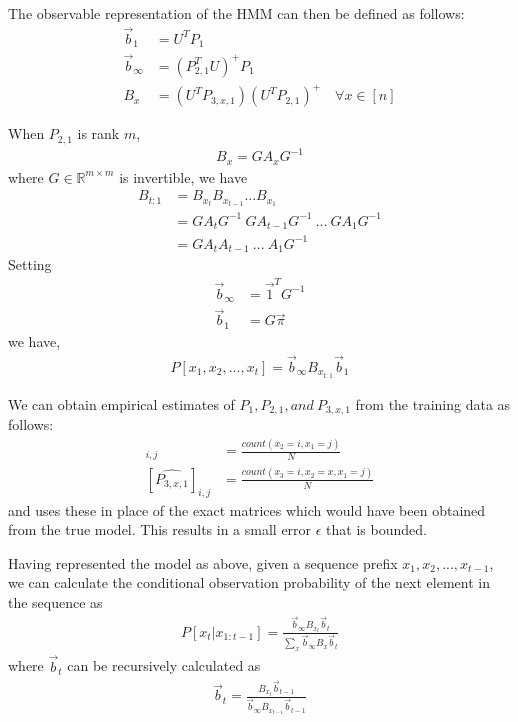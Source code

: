 \documentclass[letterpaper]{article}
\begin{document}
The observable representation of the HMM can then be defined as follows:
\begin{align*}
	\vec b_{1}      & = U^{T}P_{1}                                                 \\
	\vec b_{\infty} & = (P_{2,1}^{T}U)^{+}P_{1}                                    \\
	B_{x}           & = (U^{T}P_{3,x,1})(U^{T}P_{2,1})^{+} \quad \forall x \in [n] 
\end{align*}

When $P_{2,1}$ is rank $m$, 
\begin{align*}
	B_{x} = GA_{x}G^{-1} 
\end{align*}
where $G \in \mathbb{R}^{m \times m}$ is invertible, we have
\begin{align*}
	B_{t:1} & = B_{x_{t}}B_{x_{t-1}}...B_{x_{1}}                \\
	        & = GA_{t}G^{-1}\ GA_{t-1}G^{-1}\ ...\ GA_{1}G^{-1} \\
	        & = GA_{t}A_{t-1}\ ...\ A_{1}G^{-1}                 
\end{align*}
Setting 
\begin{align*}
	\vec b_{\infty} & = \vec 1^{T}G^{-1} \\
	\vec b_{1}      & = G\vec \pi        
\end{align*}
we have,
\begin{align*}
	P[x_{1}, x_{2}, ..., x_{t}]  = \vec b_{\infty}B_{x_{t:1}} \vec b_{1} 
\end{align*}

We can obtain empirical estimates of $P_{1}, P_{2,1}, and \ P_{3,x,1}$  from the training data as follows:
\begin{align*}
	[\hat{P_{2,1}}]_{i,j}   & = \frac{count(x_{2} = i, x_{1} = j)}{N}             \\
	[\hat{P_{3,x,1}}]_{i,j} & = \frac{count(x_{3} = i, x_{2} = x, x_{1} = j)}{ N} 
\end{align*}
and uses these in place of the exact matrices which would have been obtained from the true model. This results in a small error $\epsilon$ that is bounded.

Having represented the model as above, given a sequence prefix $x_{1}, x_{2}, ..., x_{t-1}$, we can calculate the conditional observation probability of the next element in the sequence as 
\begin{align*}
	P[x_t | x_{1:t-1}] =  \frac{\vec b_{\infty}B_{x_{t}} \vec b_{t}}{\sum_{x} \vec b_{\infty}B_{x} \vec b_{t}} 
\end{align*}
where $\vec b_{t}$ can be recursively calculated as
\begin{align*}
	\vec b_{t} = \frac{B_{x_{t}}\vec b_{t-1}}{\vec b_{\infty}B_{x_{t-1}} \vec b_{t-1}} 
\end{align*}
\end{document}
